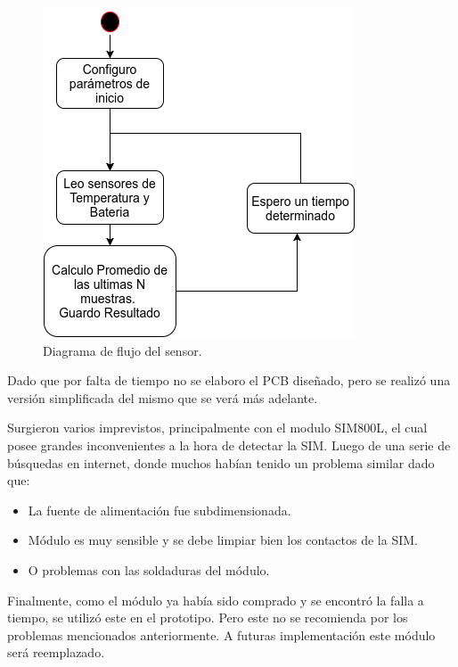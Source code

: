 \begin{figure}[!hp]
  \centering
  \includegraphics[scale=.5]{./Figures/sensor_task.png}
  \caption{Diagrama de flujo del sensor.}
  \label{fig:sensor_task}
\end{figure}











Dado que por falta de tiempo no se elaboro el PCB diseñado, pero se realizó una versión simplificada del mismo que se verá más adelante. 

Surgieron varios imprevistos, principalmente con el modulo SIM800L, el cual posee grandes inconvenientes a la hora de detectar la SIM. Luego de una serie de búsquedas en internet, donde muchos habían tenido un problema similar dado que:
\begin{itemize}
  \item La fuente de alimentación fue subdimensionada.
  \item Módulo es muy sensible y se debe limpiar bien los contactos de la SIM.
  \item O problemas con las soldaduras del módulo.
\end{itemize}
Finalmente, como el módulo ya había sido comprado y se encontró la falla a tiempo, se utilizó este en el prototipo.
Pero este no se recomienda por los problemas mencionados anteriormente. A futuras implementación este módulo será reemplazado.












